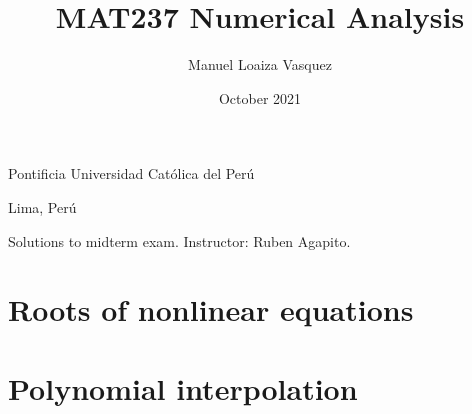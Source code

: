 \title{MAT237 Numerical Analysis}
\author{Manuel Loaiza Vasquez}
\date{October 2021}



\maketitle

\vspace*{-0.25in}
\centerline{Pontificia Universidad Cat\'olica del Per\'u}
\centerline{Lima, Per\'u}
\centerline{}
\vspace*{0.15in}

\begin{framed}
    Solutions to midterm exam.
    Instructor: Ruben Agapito.
\end{framed}

\section{Roots of nonlinear equations}





\section{Polynomial interpolation}












